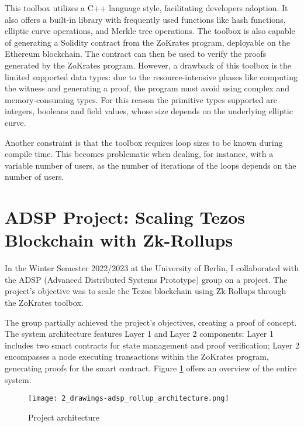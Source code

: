 This toolbox utilizes a C++ language style, facilitating developers adoption. It also offers a built-in library with frequently used functions like hash functions, elliptic curve operations, and Merkle tree operations. The toolbox is also capable of generating a Solidity contract from the ZoKrates program, deployable on the Ethereum blockchain. The contract can then be used to verify the proofs generated by the ZoKrates program. However, a drawback of this toolbox is the limited supported data types: due to the resource-intensive phases like computing the witness and generating a proof, the program must avoid using complex and memory-consuming types. For this reason the primitive types supported are integers, booleans and field values, whose size depends on the underlying elliptic curve.

Another constraint is that the toolbox requires loop sizes to be known during compile time. This becomes problematic when dealing, for instance, with a variable number of users, as the number of iterations of the loops depends on the number of users.

\section{ADSP Project: Scaling Tezos Blockchain with Zk-Rollups \label{sec:2_adspProject}}

In the Winter Semester 2022/2023 at the University of Berlin, I collaborated with the ADSP (Advanced Distributed Systems Prototype) group on a project. The project's objective was to scale the Tezos blockchain using Zk-Rollups through the ZoKrates toolbox.

The group partially achieved the project's objectives, creating a proof of concept. The system architecture features Layer 1 and Layer 2 components: Layer 1 includes two smart contracts for state management and proof verification; Layer 2 encompasses a node executing transactions within the ZoKrates program, generating proofs for the smart contract. Figure \ref{fig:2_general_rollup_architecture} offers an overview of the entire system.

\begin{figure}[ht]
  \centering
  \texttt{[image: 2\_drawings-adsp\_rollup\_architecture.png]}
  \caption[Project Architecture]{Project architecture}  
  \label{fig:2_general_rollup_architecture}
\end{figure}

